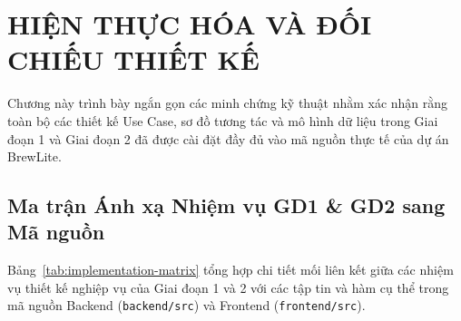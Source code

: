 \chapter{HIỆN THỰC HÓA VÀ ĐỐI CHIẾU THIẾT KẾ}

Chương này trình bày ngắn gọn các minh chứng kỹ thuật nhằm xác nhận rằng toàn bộ các thiết kế Use Case, sơ đồ tương tác và mô hình dữ liệu trong Giai đoạn 1 và Giai đoạn 2 đã được cài đặt đầy đủ vào mã nguồn thực tế của dự án BrewLite.

\section{Ma trận Ánh xạ Nhiệm vụ GD1 \& GD2 sang Mã nguồn}
Bảng~\ref{tab:implementation-matrix} tổng hợp chi tiết mối liên kết giữa các nhiệm vụ thiết kế nghiệp vụ của Giai đoạn 1 và 2 với các tập tin và hàm cụ thể trong mã nguồn Backend (\texttt{backend/src}) và Frontend (\texttt{frontend/src}).

